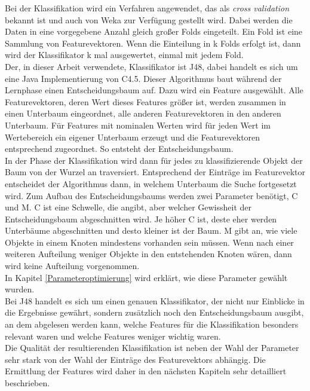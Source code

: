 Bei der Klassifikation wird ein Verfahren angewendet, das als \textit{cross validation} bekannt ist und auch von Weka zur Verfügung gestellt wird. Dabei werden die Daten in eine vorgegebene Anzahl gleich großer Folds eingeteilt. Ein Fold ist eine Sammlung von Featurevektoren. Wenn die Einteilung in k Folds erfolgt ist, dann wird der Klassifikator k mal ausgewertet, einmal mit jedem Fold.\\
Der, in dieser Arbeit verwendete, Klassifikator ist J48, dabei handelt es sich um eine Java Implementierung von C4.5.  Dieser Algorithmus baut während der Lernphase einen Entscheidungsbaum auf. Dazu wird ein Feature ausgewählt. Alle Featurevektoren, deren Wert dieses Features größer ist, werden zusammen in einen Unterbaum eingeordnet, alle anderen Featurevektoren in den anderen Unterbaum. Für Features mit nominalen Werten wird für jeden Wert im Wertebereich ein eigener Unterbaum erzeugt und die Featurevektoren entsprechend zugeordnet. So entsteht der Entscheidungsbaum.\\
In der Phase der Klassifikation wird dann für jedes zu klassifizierende Objekt der Baum von der Wurzel an traversiert. Entsprechend der Einträge im Featurevektor entscheidet der Algorithmus dann, in welchem Unterbaum die Suche fortgesetzt wird. Zum Aufbau des Entscheidungsbaums werden zwei Parameter benötigt, C und M. C ist eine Schwelle, die angibt, aber welcher Gewissheit der Entscheidungsbaum abgeschnitten wird. Je höher C ist, deste eher werden Unterbäume abgeschnitten und desto kleiner ist der Baum. M gibt an, wie viele Objekte in einem Knoten mindestens vorhanden sein müssen. Wenn nach einer weiteren Aufteilung weniger Objekte in den entstehenden Knoten wären, dann wird keine Aufteilung vorgenommen.\cite[Kapitel 6.1]{Witten2011}\\
In Kapitel \ref{Parameteroptimierung} wird erklärt, wie diese Parameter gewählt wurden.\\
Bei J48 handelt es sich um einen genauen Klassifikator, der nicht nur Einblicke in die Ergebnisse gewährt, sondern zusätzlich noch den Entscheidungsbaum ausgibt, an dem abgelesen werden kann, welche Features für die Klassifikation besonders relevant waren und welche Features weniger wichtig waren.\\
Die Qualität der resultierenden Klassifikation ist neben der Wahl der Parameter sehr stark von der Wahl der Einträge des Featurevektors abhängig. Die Ermittlung der Features wird daher in den nächsten Kapiteln sehr detailliert beschrieben.\\